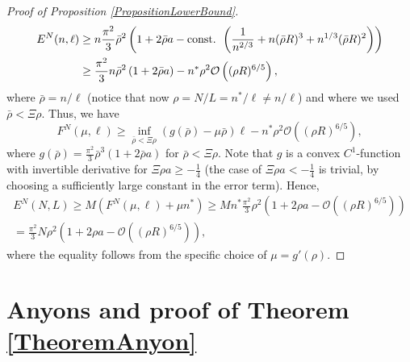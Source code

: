 \documentclass[a4paper,11pt]{article}
\newcommand{\dom}[1]{\mathcal D\left(#1\right)}
\newcommand{\ie}{\emph{i.e.} }
\numberwithin{equation}{section}
\begin{document}
\begin{proof}[Proof of Proposition \ref{PropositionLowerBound}]
\begin{equation}
\begin{aligned}
			E^{N}(n,\ell)&\geq n\frac{\pi^2}{3}\bar{\rho}^2\left(1+2\bar{\rho} a-\textnormal{const. }\left(\frac{1}{n^{2/3}}+n(\bar{\rho} R)^3+n^{1/3}(\bar{\rho} R)^2\right)\right)\\
			&\geq \frac{\pi^2}{3}n\bar{\rho}^2\left(1+2\bar{\rho}a\right)-n^*\rho^2\mathcal{O}\left((\rho R)^{6/5}\right),
			\end{aligned}
			\end{equation}
			where $ \bar{\rho}=n/\ell $ (notice that now $ \rho=N/L=n^\ast/\ell\neq n/\ell $) and where we used $ \bar{\rho}<\Xi\rho$.
			Thus, we have \begin{equation}
			F^{N}(\mu,\ell)\geq \inf_{\bar{\rho}<\Xi\rho}(g(\bar{\rho})-\mu\bar{\rho})\ell-n^\ast \rho^2 \mathcal{O}\left((\rho R)^{6/5}\right),
			\end{equation}
			where $
			g(\bar{\rho})=
			\frac{\pi^2}{3}\bar{\rho}^3\left(1+2\bar{\rho}a\right)
			$ for $ \bar{\rho}<\Xi\rho $. Note that $ g $ is a convex $ C^{1} $-function with invertible derivative for $ \Xi\rho a\geq -\frac{1}{4}  $ (the case of $ \Xi\rho a<-\frac{1}{4} $ is trivial, by choosing a sufficiently large constant in the error term). Hence, \begin{equation}
			\begin{aligned}
			E^{N}(N,L)\geq M(F^{N}(\mu,\ell)+\mu n^*)\geq Mn^\ast\frac{\pi^2}{3} \rho^2 \left(1+2\rho a-\mathcal{O}\left((\rho R)^{6/5}\right)\right)\\
			=\frac{\pi^2}{3} N\rho^2 \left(1+2\rho a-\mathcal{O}\left((\rho R)^{6/5}\right)\right),
			\end{aligned}
			\end{equation}
			where the equality follows from the specific choice of $ \mu=g'(\rho) $.
		\end{proof}
		
\section{Anyons and proof of Theorem \ref{TheoremAnyon}}
\label{SectionOtherSymmetries}

\end{document}
